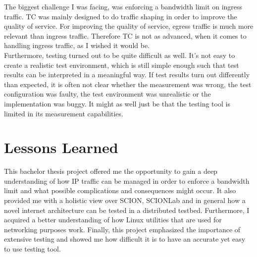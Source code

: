The biggest challenge I was facing, was enforcing a bandwidth limit on ingress traffic. \acs{TC} was mainly designed to do traffic shaping in order to improve the quality of service. For improving the quality of service, egress traffic is much more relevant than ingress traffic. Therefore \acs{TC} is not as advanced, when it comes to handling ingress traffic, as I wished it would be.
\\
Furthermore, testing turned out to be quite difficult as well. It's not easy to create a realistic test environment, which is still simple enough such that test results can be interpreted in a meaningful way. If test results turn out differently than expected, it is often not clear whether the measurement was wrong, the test configuration was faulty, the test environment was unrealistic or the implementation was buggy. It might as well just be that the testing tool is limited in its measurement capabilities. 

\section{Lessons Learned}

This bachelor thesis project offered me the opportunity to gain a deep understanding of how \acs{IP} traffic can be managed in order to enforce a bandwidth limit and what possible complications and consequences might occur. It also provided me with a holistic view over \acs{SCION}, \acs{SCIONLab} and in general how a novel internet architecture can be tested in a distributed testbed. Furthermore, I acquired a better understanding of how Linux utilities that are used for networking purposes work. Finally, this project emphasized the importance of extensive testing and showed me how difficult it is to have an accurate yet easy to use testing tool.